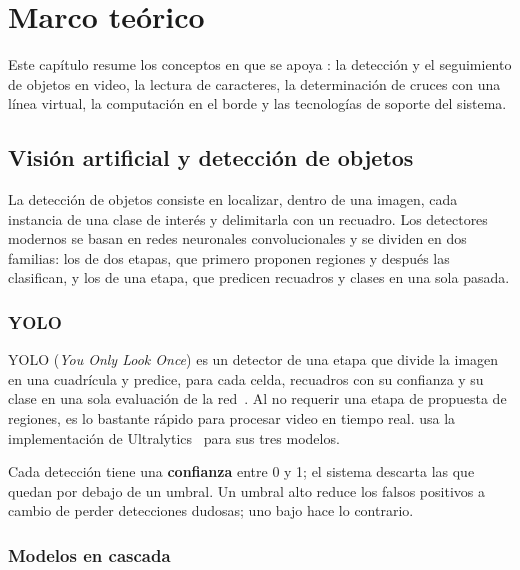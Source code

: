 \chapter{Marco teórico}
\label{cap:marco}

Este capítulo resume los conceptos en que se apoya \saru{}: la detección y
el seguimiento de objetos en video, la lectura de caracteres, la
determinación de cruces con una línea virtual, la computación en el borde y
las tecnologías de soporte del sistema.

\section{Visión artificial y detección de objetos}

La detección de objetos consiste en localizar, dentro de una imagen, cada
instancia de una clase de interés y delimitarla con un recuadro. Los
detectores modernos se basan en redes neuronales convolucionales y se
dividen en dos familias: los de dos etapas, que primero proponen regiones y
después las clasifican, y los de una etapa, que predicen recuadros y clases
en una sola pasada.

\subsection{YOLO}

YOLO (\emph{You Only Look Once}) es un detector de una etapa que divide la
imagen en una cuadrícula y predice, para cada celda, recuadros con su
confianza y su clase en una sola evaluación de la red~\cite{redmon2016yolo}.
Al no requerir una etapa de propuesta de regiones, es lo bastante rápido
para procesar video en tiempo real. \saru{} usa la implementación de
Ultralytics~\cite{ultralytics} para sus tres modelos.

Cada detección tiene una \textbf{confianza} entre 0 y 1; el sistema
descarta las que quedan por debajo de un umbral. Un umbral alto reduce los
falsos positivos a cambio de perder detecciones dudosas; uno bajo hace lo
contrario.

\subsection{Modelos en cascada}

